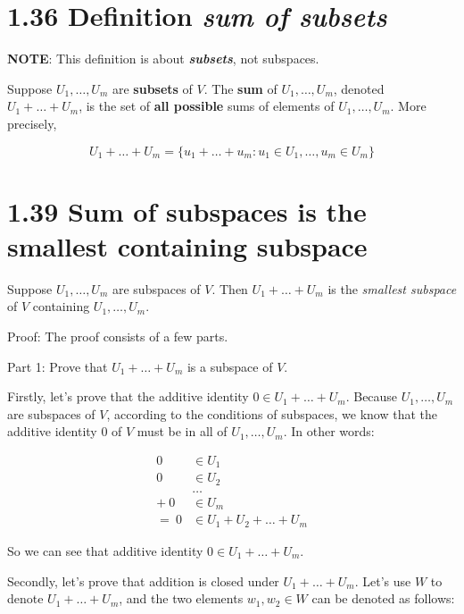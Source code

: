 \documentclass[12pt, letterpaper, oneside]{book}
\begin{document}
\section{1.36 Definition \textbf{\textit{sum of subsets}}}

\textbf{NOTE}: This definition is about \textbf{\textit{subsets}}, not
subspaces.

Suppose $U_1, \ldots, U_m$ are \textbf{subsets} of $V$. The \textbf{sum} of
$U_1, \ldots, U_m$, denoted $U_1 + \ldots + U_m$, is the set of \textbf{all
possible} sums of elements of $U_1, \ldots, U_m$. More precisely,

\[
U_1 + \ldots + U_m = \{ u_1 + \ldots + u_m: u_1 \in U_1, \ldots, u_m \in U_m \}
\]

\section{1.39 Sum of subspaces is the smallest containing subspace}

Suppose $U_1, \ldots, U_m$ are subspaces of $V$. Then $U_1 + \ldots + U_m$ is
the \textit{smallest subspace} of $V$ containing $U_1, \ldots, U_m$.

Proof: The proof consists of a few parts.

Part 1: Prove that $U_1 + \ldots + U_m$ is a subspace of $V$.

Firstly, let's prove that the additive identity $0 \in U_1 + \ldots + U_m$.
Because $U_1, \ldots, U_m$ are subspaces of $V$, according to the conditions of
subspaces, we know that the additive identity $0$ of $V$ must be in all of
$U_1, \ldots, U_m$. In other words:

\begin{align*}
      0 & \in U_1 \\
      0 & \in U_2 \\
        & \ldots \\
  + \ 0 & \in U_m \\
  = \ 0 & \in U_1 + U_2 + \ldots + U_m
\end{align*}

So we can see that additive identity $0 \in U_1 + \ldots + U_m$.

Secondly, let's prove that addition is closed under $U_1 + \ldots + U_m$. Let's
use $W$ to denote $U_1 + \ldots + U_m$, and the two elements $w_1, w_2 \in W$
can be denoted as follows:
\end{document}
